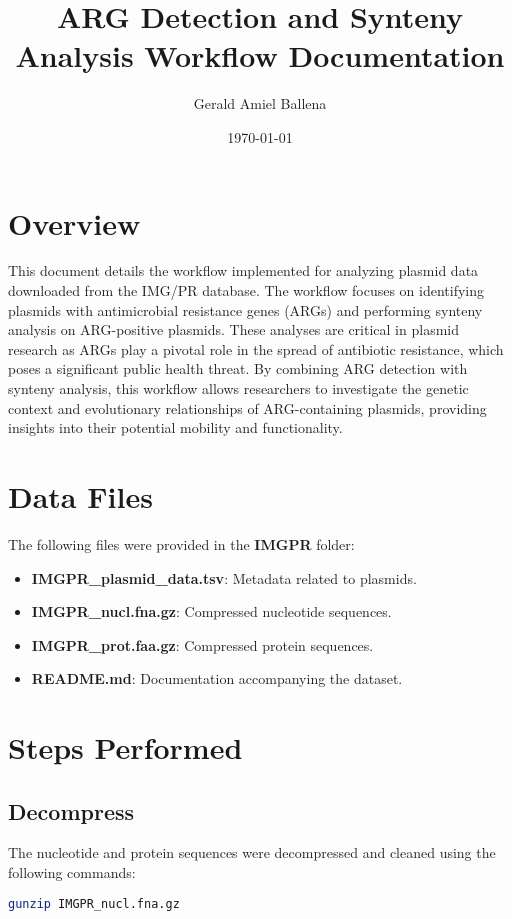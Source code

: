\documentclass[a4paper,12pt]{report}
\title{ARG Detection and Synteny Analysis Workflow Documentation}
\author{Gerald Amiel Ballena}
\date{\today}
\begin{document}
	
	\maketitle
	
	\section*{Overview}
	This document details the workflow implemented for analyzing plasmid data downloaded from the IMG/PR database. The workflow focuses on identifying plasmids with antimicrobial resistance genes (ARGs) and performing synteny analysis on ARG-positive plasmids. These analyses are critical in plasmid research as ARGs play a pivotal role in the spread of antibiotic resistance, which poses a significant public health threat. By combining ARG detection with synteny analysis, this workflow allows researchers to investigate the genetic context and evolutionary relationships of ARG-containing plasmids, providing insights into their potential mobility and functionality.
	
	\section*{Data Files}
	The following files were provided in the \textbf{IMGPR} folder:
	\begin{itemize}
		\item \textbf{IMGPR\_plasmid\_data.tsv}: Metadata related to plasmids.
		\item \textbf{IMGPR\_nucl.fna.gz}: Compressed nucleotide sequences.
		\item \textbf{IMGPR\_prot.faa.gz}: Compressed protein sequences.
		\item \textbf{README.md}: Documentation accompanying the dataset.
	\end{itemize}
	
	\section*{Steps Performed}
	
	\subsection*{Decompress}
	The nucleotide and protein sequences were decompressed and cleaned using the following commands:
	\begin{lstlisting}[language=bash]
		gunzip IMGPR_nucl.fna.gz
	\end{lstlisting}
	
\end{document}
